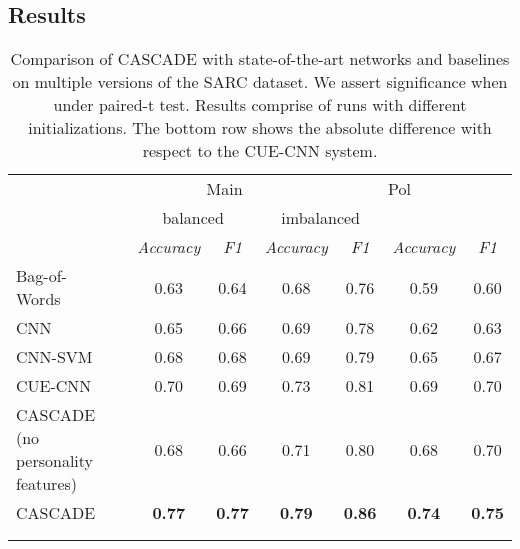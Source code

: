 \documentclass[11pt]{article}
\begin{document}
{ 
\subsection{Results} \label{sec:results}
\begin{table}[t!]
	\small
	\newcommand\Y{\hphantom{}}
	\newcommand\X{\%\Y}
	\begin{center}
		\begin{tabular}{lc|c|c|c|c|c|c}
			\Xhline{3\arrayrulewidth}
			\multicolumn{2}{l|}{\multirow{3}{*}{Models}}&\multicolumn{4}{|c}{Main}&\multicolumn{2}{|c}{Pol} \\ \cline{3-8}
		   	&&\multicolumn{2}{|c}{balanced}&\multicolumn{2}{|c|}{imbalanced}&\multicolumn{2}{|c}{}\\ \cline{3-8}
            &&\scriptsize{\textit{Accuracy}}&\scriptsize{\textit{F1}}&\scriptsize{\textit{Accuracy}}&\scriptsize{\textit{F1}}&\scriptsize{\textit{Accuracy}}& \scriptsize{\textit{F1}}\\ \hline \hline
            Bag-of-Words&&0.63&0.64&0.68&0.76&0.59&0.60\\
            CNN&&0.65&0.66&0.69&0.78&0.62&0.63\\
            CNN-SVM~\cite{poria2016deeper}&&0.68&0.68&0.69&0.79&0.65&0.67\\ 
            CUE-CNN~\cite{amir2016modelling}&&0.70&0.69&0.73&0.81&0.69&0.70\\ \hline
            CASCADE (no personality features)&&0.68&0.66&0.71&0.80&0.68&0.70\\
            
      CASCADE&&\textbf{0.77}&\textbf{0.77}&\textbf{0.79}&\textbf{0.86}&\textbf{0.74}&\textbf{0.75}\\ \hline \hline
            && \textcolor{mygreen}{} & \textcolor{mygreen}{} & \textcolor{mygreen}{} & \textcolor{mygreen}{} & \textcolor{mygreen}{} & \textcolor{mygreen}{} \\ \Xhline{3\arrayrulewidth} 
            \multicolumn{8}{l}{\scriptsize{}:significantly better than CUE-CNN~\cite{amir2016modelling}.}
		\end{tabular}
	\end{center} 
	
	\vspace{-0.4cm}
	\caption {Comparison of CASCADE with state-of-the-art networks and baselines on multiple versions of the SARC dataset. We assert significance when  under paired-t test. Results comprise of  runs with different initializations. The bottom row shows the absolute difference with respect to the CUE-CNN system.}
	\label{table:results}
\end{table} 

}
\end{document}
